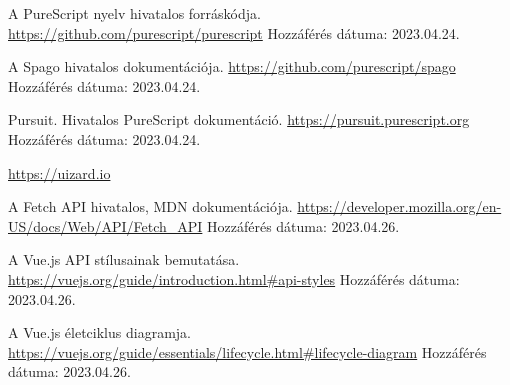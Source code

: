 \documentclass[12pt]{article}
\begin{document}
\begin{thebibliography}{99}
A PureScript nyelv hivatalos forráskódja.
\url{https://github.com/purescript/purescript} Hozzáférés dátuma: 2023.04.24.

A Spago hivatalos dokumentációja.
\url{https://github.com/purescript/spago} Hozzáférés dátuma: 2023.04.24.

Pursuit. Hivatalos PureScript dokumentáció.
\url{https://pursuit.purescript.org} Hozzáférés dátuma: 2023.04.24.

\url{https://uizard.io} 

A Fetch API hivatalos, MDN dokumentációja. \url{https://developer.mozilla.org/en-US/docs/Web/API/Fetch_API} Hozzáférés dátuma: 2023.04.26.

A Vue.js API stílusainak bemutatása. \url{https://vuejs.org/guide/introduction.html#api-styles} Hozzáférés dátuma: 2023.04.26.

A Vue.js életciklus diagramja. \url{https://vuejs.org/guide/essentials/lifecycle.html#lifecycle-diagram} Hozzáférés dátuma: 2023.04.26.

\end{thebibliography}
\end{document}
